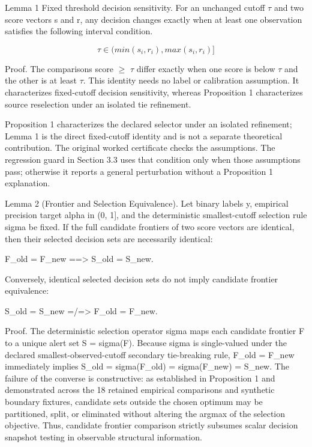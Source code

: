 \documentclass[11pt,a4paper]{article}
\begin{document}
Lemma 1 Fixed threshold decision sensitivity. For an unchanged cutoff \ensuremath{\tau} and two score vectors s and r, any decision changes exactly when at least one observation satisfies the following interval condition.

\[\tau  \in  (min({s}_{i}, {r}_{i}), max({s}_{i}, {r}_{i})]\]

Proof. The comparisons score \ensuremath{\geq} \ensuremath{\tau} differ exactly when one score is below \ensuremath{\tau} and the other is at least \ensuremath{\tau}. This identity needs no label or calibration assumption. It characterizes fixed-cutoff decision sensitivity, whereas Proposition 1 characterizes source reselection under an isolated tie refinement.

Proposition 1 characterizes the declared selector under an isolated refinement; Lemma 1 is the direct fixed-cutoff identity and is not a separate theoretical contribution. The original worked certificate checks the assumptions. The regression guard in Section 3.3 uses that condition only when those assumptions pass; otherwise it reports a general perturbation without a Proposition 1 explanation.

Lemma 2 (Frontier and Selection Equivalence). Let binary labels y, empirical precision target alpha in (0, 1], and the deterministic smallest-cutoff selection rule sigma be fixed. If the full candidate frontiers of two score vectors are identical, then their selected decision sets are necessarily identical:

    F\_old = F\_new  ==>  S\_old = S\_new.

Conversely, identical selected decision sets do not imply candidate frontier equivalence:

    S\_old = S\_new  =/=>  F\_old = F\_new.

Proof. The deterministic selection operator sigma maps each candidate frontier F to a unique alert set S = sigma(F). Because sigma is single-valued under the declared smallest-observed-cutoff secondary tie-breaking rule, F\_old = F\_new immediately implies S\_old = sigma(F\_old) = sigma(F\_new) = S\_new. The failure of the converse is constructive: as established in Proposition 1 and demonstrated across the 18 retained empirical comparisons and synthetic boundary fixtures, candidate sets outside the chosen optimum may be partitioned, split, or eliminated without altering the argmax of the selection objective. Thus, candidate frontier comparison strictly subsumes scalar decision snapshot testing in observable structural information.
\end{document}
